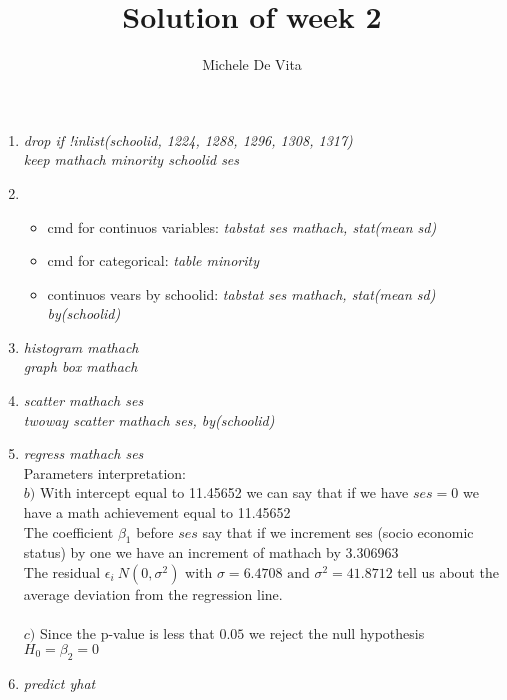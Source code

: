 \documentclass[10pt,a4paper]{article}
\begin{document}
	\author{Michele De Vita}
	\title{Solution of week 2}
	\maketitle
	\noindent
	\begin{enumerate}
		\item \textit{drop if !inlist(schoolid, 1224, 1288, 1296, 1308, 1317)} \\
		\textit{keep mathach minority schoolid ses}
		\item \begin{itemize}
			\item cmd for continuos variables: \textit{tabstat  ses mathach, stat(mean sd)} \\
			\item cmd for categorical: \textit{table minority}
			\item continuos vears by schoolid: \textit{tabstat ses mathach, stat(mean sd) by(schoolid)}

		\end{itemize}
			\item \textit{histogram mathach} \\
			\textit{graph box mathach}
			\item \textit{scatter mathach ses \\
				twoway scatter mathach ses, by(schoolid)
			}
		\item \textit{regress mathach ses}\\
		Parameters interpretation:\\

		$ b) $ With intercept  equal to 11.45652 we can say that if we have $ ses = 0 $ we have a math achievement equal to 11.45652\\
		The coefficient $ \beta_1 $ before $ ses $ say that if we increment ses (socio economic status) by one we have an increment of mathach by 3.306963\\
		The residual $ \epsilon_i  ~ N(0, \sigma^2)$ with $ \sigma = 6.4708 \text{ and } \sigma^2=41.8712$ tell us about the average deviation from the regression line.\\ \\
		$ c) $ Since the p-value is less that $ 0.05 $ we reject the null hypothesis $ H_0 = \beta_2 = 0 $ 

	\item \textit{predict yhat}
	

\end{enumerate}
\end{document}
